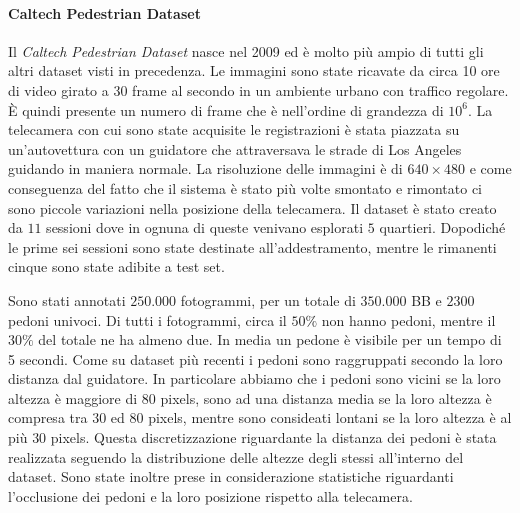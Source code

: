 \paragraph{Caltech Pedestrian Dataset} Il \textit{Caltech Pedestrian Dataset} \cite{dollar2009pedestrian} nasce nel 2009 ed è molto più ampio di tutti gli altri dataset visti in precedenza. Le immagini sono state ricavate da circa 10 ore di video girato a 30 frame al secondo in un ambiente urbano con traffico regolare. È quindi presente un numero di frame che è nell'ordine di grandezza di $10^6$. La telecamera con cui sono state acquisite le registrazioni è stata piazzata su un'autovettura con un guidatore che attraversava le strade di Los Angeles guidando in maniera normale. La risoluzione delle immagini è di $640 \times 480$ e come conseguenza del fatto che il sistema è stato più volte smontato e rimontato ci sono piccole variazioni nella posizione della telecamera. Il dataset è stato creato da $11$ sessioni dove in ognuna di queste venivano esplorati $5$ quartieri. Dopodiché le prime sei sessioni sono state destinate all'addestramento, mentre le rimanenti cinque sono state adibite a test set.

Sono stati annotati $250.000$ fotogrammi, per un totale di $350.000$ \ac{BB} e $2300$ pedoni univoci. Di tutti i fotogrammi, circa il $50\%$ non hanno pedoni, mentre il $30\%$ del totale ne ha almeno due. In media un pedone è visibile per un tempo di 5 secondi. Come su dataset più recenti i pedoni sono raggruppati secondo la loro distanza dal guidatore. In particolare abbiamo che i pedoni sono vicini se la loro altezza è maggiore di $80$ pixels, sono ad una distanza media se la loro altezza è compresa tra $30$ ed $80$ pixels, mentre sono consideati lontani se la loro altezza è al più $30$ pixels. Questa discretizzazione riguardante la distanza dei pedoni è stata realizzata seguendo la distribuzione delle altezze degli stessi all'interno del dataset. Sono state inoltre prese in considerazione statistiche riguardanti l'occlusione dei pedoni e la loro posizione rispetto alla telecamera.



